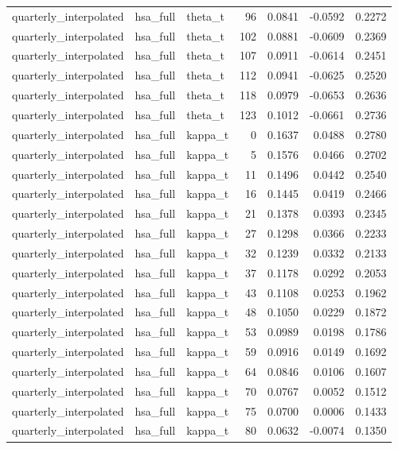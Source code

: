 \begin{tabular}{lllrrrr}
quarterly\_interpolated & hsa\_full & theta\_t & 96 & 0.0841 & -0.0592 & 0.2272 \\
quarterly\_interpolated & hsa\_full & theta\_t & 102 & 0.0881 & -0.0609 & 0.2369 \\
quarterly\_interpolated & hsa\_full & theta\_t & 107 & 0.0911 & -0.0614 & 0.2451 \\
quarterly\_interpolated & hsa\_full & theta\_t & 112 & 0.0941 & -0.0625 & 0.2520 \\
quarterly\_interpolated & hsa\_full & theta\_t & 118 & 0.0979 & -0.0653 & 0.2636 \\
quarterly\_interpolated & hsa\_full & theta\_t & 123 & 0.1012 & -0.0661 & 0.2736 \\
quarterly\_interpolated & hsa\_full & kappa\_t & 0 & 0.1637 & 0.0488 & 0.2780 \\
quarterly\_interpolated & hsa\_full & kappa\_t & 5 & 0.1576 & 0.0466 & 0.2702 \\
quarterly\_interpolated & hsa\_full & kappa\_t & 11 & 0.1496 & 0.0442 & 0.2540 \\
quarterly\_interpolated & hsa\_full & kappa\_t & 16 & 0.1445 & 0.0419 & 0.2466 \\
quarterly\_interpolated & hsa\_full & kappa\_t & 21 & 0.1378 & 0.0393 & 0.2345 \\
quarterly\_interpolated & hsa\_full & kappa\_t & 27 & 0.1298 & 0.0366 & 0.2233 \\
quarterly\_interpolated & hsa\_full & kappa\_t & 32 & 0.1239 & 0.0332 & 0.2133 \\
quarterly\_interpolated & hsa\_full & kappa\_t & 37 & 0.1178 & 0.0292 & 0.2053 \\
quarterly\_interpolated & hsa\_full & kappa\_t & 43 & 0.1108 & 0.0253 & 0.1962 \\
quarterly\_interpolated & hsa\_full & kappa\_t & 48 & 0.1050 & 0.0229 & 0.1872 \\
quarterly\_interpolated & hsa\_full & kappa\_t & 53 & 0.0989 & 0.0198 & 0.1786 \\
quarterly\_interpolated & hsa\_full & kappa\_t & 59 & 0.0916 & 0.0149 & 0.1692 \\
quarterly\_interpolated & hsa\_full & kappa\_t & 64 & 0.0846 & 0.0106 & 0.1607 \\
quarterly\_interpolated & hsa\_full & kappa\_t & 70 & 0.0767 & 0.0052 & 0.1512 \\
quarterly\_interpolated & hsa\_full & kappa\_t & 75 & 0.0700 & 0.0006 & 0.1433 \\
quarterly\_interpolated & hsa\_full & kappa\_t & 80 & 0.0632 & -0.0074 & 0.1350 \\

\end{tabular}
